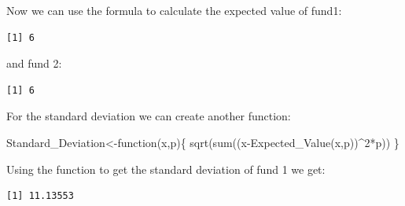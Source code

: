 \documentclass[
  letterpaper,
  DIV=11,
  numbers=noendperiod]{scrreprt}
\newenvironment{Shaded}{\begin{snugshade}}{\end{snugshade}}
\newcommand{\ControlFlowTok}[1]{\textcolor[rgb]{0.00,0.23,0.31}{#1}}
\newcommand{\DecValTok}[1]{\textcolor[rgb]{0.68,0.00,0.00}{#1}}
\newcommand{\FunctionTok}[1]{\textcolor[rgb]{0.28,0.35,0.67}{#1}}
\newcommand{\NormalTok}[1]{\textcolor[rgb]{0.00,0.23,0.31}{#1}}
\newcommand{\OtherTok}[1]{\textcolor[rgb]{0.00,0.23,0.31}{#1}}
\newcommand{\SpecialCharTok}[1]{\textcolor[rgb]{0.37,0.37,0.37}{#1}}
\begin{document}
Now we can use the formula to calculate the expected value of fund1:

\begin{Shaded}
\end{Shaded}

\begin{verbatim}
[1] 6
\end{verbatim}

and fund 2:

\begin{Shaded}
\end{Shaded}

\begin{verbatim}
[1] 6
\end{verbatim}

For the standard deviation we can create another function:

\begin{Shaded}
\begin{Highlighting}[numbers=left,,]
\NormalTok{Standard\_Deviation}\OtherTok{\textless{}{-}}\ControlFlowTok{function}\NormalTok{(x,p)\{}
  \FunctionTok{sqrt}\NormalTok{(}\FunctionTok{sum}\NormalTok{((x}\SpecialCharTok{{-}}\FunctionTok{Expected\_Value}\NormalTok{(x,p))}\SpecialCharTok{\^{}}\DecValTok{2}\SpecialCharTok{*}\NormalTok{p))}
\NormalTok{\}}
\end{Highlighting}
\end{Shaded}

Using the function to get the standard deviation of fund 1 we get:

\begin{Shaded}
\end{Shaded}

\begin{verbatim}
[1] 11.13553
\end{verbatim}
\end{document}
